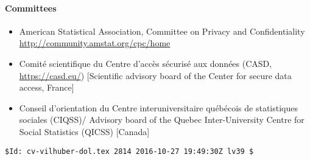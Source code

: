 \documentclass[12pt,letterpaper]{report}
\begin{document}
\paragraph{Committees} 
\begin{itemize}
\item American Statistical Association, Committee on Privacy and Confidentiality \url{http://community.amstat.org/cpc/home}
\item Comit\'e scientifique du Centre d'acc\`es s\'ecuris\'e aux 
donn\'ees (CASD, \url{https://casd.eu/}) [Scientific advisory board of the Center for secure data 
access, France]
\item Conseil d'orientation du Centre interuniversitaire 
qu\'eb\'ecois de statistiques sociales (CIQSS)/ Advisory board of the Quebec Inter-University 
Centre for Social Statistics (QICSS) [Canada]
\end{itemize}

{\tiny
\begin{verbatim}
$Id: cv-vilhuber-dol.tex 2814 2016-10-27 19:49:30Z lv39 $
\end{verbatim}
}

 
\end{document}
